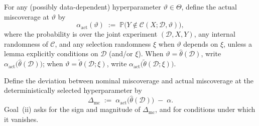 \documentclass[12pt]{article}
\theoremstyle{plain}
\begin{document}
\label{def:alpha-act}
For any (possibly data-dependent) hyperparameter $\vartheta\in\Theta$, define the actual miscoverage at $\vartheta$ by
\begin{equation}
  \label{eq:alpha-act}
  \alpha_{\mathrm{act}}(\vartheta)
  \;:=\;
  \mathbb{P}\bigl( Y\notin\mathcal{C}(X;\mathcal{D},\vartheta) \bigr),
\end{equation}
where the probability is over the joint experiment $(\mathcal{D},X,Y)$, any internal randomness of $\mathcal{C}$, and any selection randomness $\xi$ when $\vartheta$ depends on $\xi$, unless a lemma explicitly conditions on $\mathcal{D}$ (and/or $\xi$).
When $\vartheta=\hat\theta(\mathcal{D})$, write $\alpha_{\mathrm{act}}\bigl(\hat\theta(\mathcal{D})\bigr)$; when $\vartheta=\widetilde\theta(\mathcal{D};\xi)$, write $\alpha_{\mathrm{act}}\bigl(\widetilde\theta(\mathcal{D};\xi)\bigr)$.

\label{def:Delta-mc}
Define the deviation between nominal miscoverage and actual miscoverage at the deterministically selected hyperparameter by
\begin{equation}
  \label{eq:Delta-mc}
  \Delta_{\mathrm{mc}}
  \;:=\;
  \alpha_{\mathrm{act}}\bigl(\hat\theta(\mathcal{D})\bigr)
  \;-\;
  \alpha.
\end{equation}
Goal~(ii) asks for the sign and magnitude of $\Delta_{\mathrm{mc}}$, and for conditions under which it vanishes.
\end{document}
